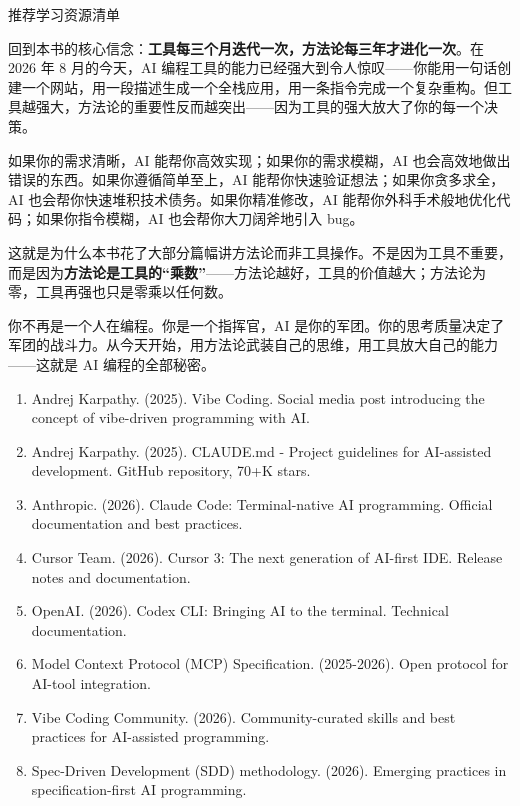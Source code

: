 \begin{center}\small\color{gray}推荐学习资源清单\end{center}


回到本书的核心信念：\textbf{工具每三个月迭代一次，方法论每三年才进化一次}。在 2026 年 8 月的今天，AI 编程工具的能力已经强大到令人惊叹——你能用一句话创建一个网站，用一段描述生成一个全栈应用，用一条指令完成一个复杂重构。但工具越强大，方法论的重要性反而越突出——因为工具的强大放大了你的每一个决策。

如果你的需求清晰，AI 能帮你高效实现；如果你的需求模糊，AI 也会高效地做出错误的东西。如果你遵循简单至上，AI 能帮你快速验证想法；如果你贪多求全，AI 也会帮你快速堆积技术债务。如果你精准修改，AI 能帮你外科手术般地优化代码；如果你指令模糊，AI 也会帮你大刀阔斧地引入 bug。

这就是为什么本书花了大部分篇幅讲方法论而非工具操作。不是因为工具不重要，而是因为\textbf{方法论是工具的“乘数”}——方法论越好，工具的价值越大；方法论为零，工具再强也只是零乘以任何数。

你不再是一个人在编程。你是一个指挥官，AI 是你的军团。你的思考质量决定了军团的战斗力。从今天开始，用方法论武装自己的思维，用工具放大自己的能力——这就是 AI 编程的全部秘密。


\begin{enumerate}
  \item Andrej Karpathy. (2025). Vibe Coding. Social media post introducing the concept of vibe-driven programming with AI.
  \item Andrej Karpathy. (2025). CLAUDE.md - Project guidelines for AI-assisted development. GitHub repository, 70+K stars.
  \item Anthropic. (2026). Claude Code: Terminal-native AI programming. Official documentation and best practices.
  \item Cursor Team. (2026). Cursor 3: The next generation of AI-first IDE. Release notes and documentation.
  \item OpenAI. (2026). Codex CLI: Bringing AI to the terminal. Technical documentation.
  \item Model Context Protocol (MCP) Specification. (2025-2026). Open protocol for AI-tool integration.
  \item Vibe Coding Community. (2026). Community-curated skills and best practices for AI-assisted programming.
  \item Spec-Driven Development (SDD) methodology. (2026). Emerging practices in specification-first AI programming.
\end{enumerate}
